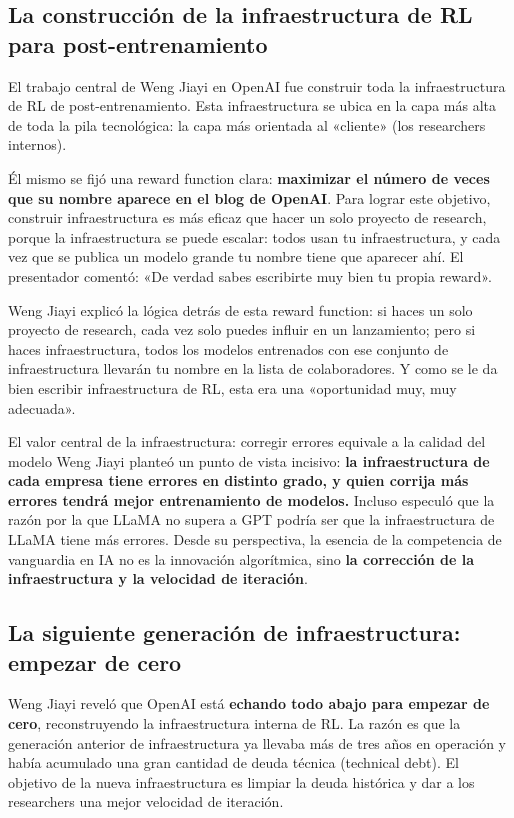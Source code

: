 \subsection{La construcción de la infraestructura de RL para post-entrenamiento}

El trabajo central de Weng Jiayi en OpenAI fue construir toda la infraestructura de RL de post-entrenamiento. Esta infraestructura se ubica en la capa más alta de toda la pila tecnológica: la capa más orientada al «cliente» (los researchers internos).

Él mismo se fijó una reward function clara: \textbf{maximizar el número de veces que su nombre aparece en el blog de OpenAI}. Para lograr este objetivo, construir infraestructura es más eficaz que hacer un solo proyecto de research, porque la infraestructura se puede escalar: todos usan tu infraestructura, y cada vez que se publica un modelo grande tu nombre tiene que aparecer ahí. El presentador comentó: «De verdad sabes escribirte muy bien tu propia reward».

Weng Jiayi explicó la lógica detrás de esta reward function: si haces un solo proyecto de research, cada vez solo puedes influir en un lanzamiento; pero si haces infraestructura, todos los modelos entrenados con ese conjunto de infraestructura llevarán tu nombre en la lista de colaboradores. Y como se le da bien escribir infraestructura de RL, esta era una «oportunidad muy, muy adecuada».

\begin{importantbox}{El valor central de la infraestructura: corregir errores equivale a la calidad del modelo}
Weng Jiayi planteó un punto de vista incisivo: \textbf{la infraestructura de cada empresa tiene errores en distinto grado, y quien corrija más errores tendrá mejor entrenamiento de modelos.} Incluso especuló que la razón por la que LLaMA no supera a GPT podría ser que la infraestructura de LLaMA tiene más errores. Desde su perspectiva, la esencia de la competencia de vanguardia en IA no es la innovación algorítmica, sino \textbf{la corrección de la infraestructura y la velocidad de iteración}.
\end{importantbox}

\subsection{La siguiente generación de infraestructura: empezar de cero}

Weng Jiayi reveló que OpenAI está \textbf{echando todo abajo para empezar de cero}, reconstruyendo la infraestructura interna de RL. La razón es que la generación anterior de infraestructura ya llevaba más de tres años en operación y había acumulado una gran cantidad de deuda técnica (technical debt). El objetivo de la nueva infraestructura es limpiar la deuda histórica y dar a los researchers una mejor velocidad de iteración.

